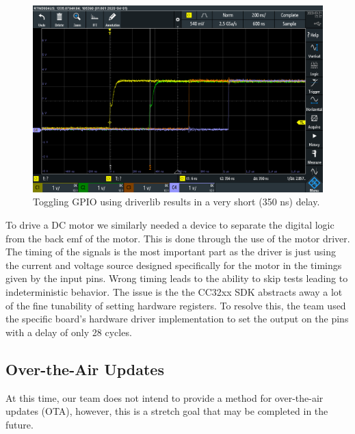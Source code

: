 \documentclass[journal]{IEEEtran}
\begin{document}
\begin{figure}[H]
	\centering
	\label{fig:gpio_toggle_driverlib}
	\includegraphics[width=\linewidth]{images/gpio_toggle_driverlib.jpg}
	\caption{Toggling GPIO using driverlib results in a very short (350 ns) delay.}
\end{figure}
To drive a DC motor we similarly needed a device to separate the digital logic from the back emf of the motor. This is done through the use of the motor driver. The timing of the signals is the most important part as the driver is just using the current and voltage source designed specifically for the motor in the timings given by the input pins. Wrong timing leads to the ability to skip tests leading to indeterministic behavior. The issue is the the CC32xx SDK abstracts away a lot of the fine tunability of setting hardware registers. To resolve this, the team used the specific board's hardware driver implementation to set the output on the pins with a delay of only 28 cycles.
\subsection{Over-the-Air Updates}
At this time, our team does not intend to provide a method for over-the-air updates (OTA), however, this is a stretch goal that may be completed in the future.


\end{document}
